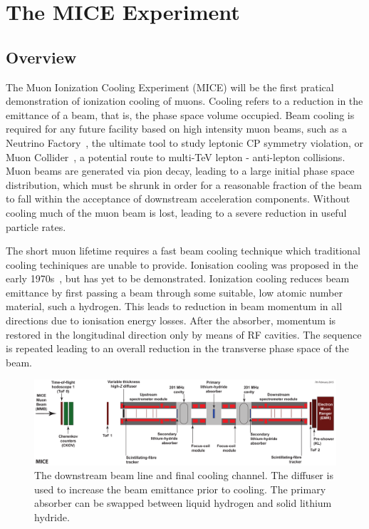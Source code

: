 \section{The MICE Experiment}
\label{sec:MICE}
  \subsection{Overview}
  \label{subsec:Overview}
  The Muon Ionization Cooling Experiment (MICE) will be the first pratical demonstration of ionization cooling of muons. Cooling refers to a reduction in the emittance of a beam, that is, the phase space volume occupied. Beam cooling is required for any future facility based on high intensity muon beams, such as a Neutrino Factory~\cite{ISS-Physics}, the ultimate tool to study leptonic CP symmetry violation, or Muon Collider~\cite{MC_Overview}, a potential route to multi-TeV lepton - anti-lepton collisions. Muon beams are generated via pion decay, leading to a large initial phase space distribution, which must be shrunk in order for a reasonable fraction of the beam to fall within the acceptance of downstream acceleration components. Without cooling much of the muon beam is lost, leading to a severe reduction in useful particle rates.   

  The short muon lifetime requires a fast beam cooling technique which traditional cooling techiniques are unable to provide.  Ionisation cooling was proposed in the early 1970s~\cite{Skrinsky, Neuffer}, but has yet to be demonstrated.  Ionization cooling reduces beam emittance by first passing a beam through some suitable, low atomic number material, such a hydrogen.  This leads to reduction in beam momentum in all directions due to ionisation energy losses.  After the absorber, momentum is restored in the longitudinal direction only by means of RF cavities.  The sequence is repeated leading to an overall reduction in the transverse phase space of the beam.

  \begin{figure}[bht]
    \begin{center}
      \includegraphics[width=1.0\linewidth]{01-MICE/Cooling-demo-labels.pdf}
      \caption{\label{fig:CoolingChannel} The downstream beam line and final cooling channel. The diffuser is used to increase the beam emittance prior to cooling. The primary absorber can be swapped between liquid hydrogen and solid lithium hydride.}
    \end{center}
  \end{figure}

